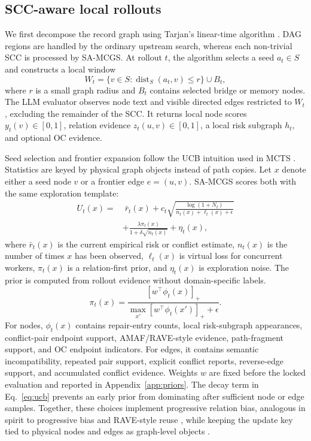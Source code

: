 \documentclass[11pt]{article}
\newcommand{\samcgs}{SA-MCGS}
\newcommand{\scc}{SCC}
\newcommand{\oc}{OC}
\begin{document}
\subsection{SCC-aware local rollouts}

We first decompose the record graph using Tarjan's linear-time algorithm \citep{tarjan1972depth}.  DAG regions are handled by the ordinary upstream search, whereas each non-trivial \scc{} is processed by \samcgs{}.  At rollout $t$, the algorithm selects a seed $a_t\in S$ and constructs a local window
\begin{equation}
    W_t = \{v\in S : \operatorname{dist}_{S}(a_t,v)\leq r\} \cup B_t,
\end{equation}
where $r$ is a small graph radius and $B_t$ contains selected bridge or memory nodes.  The LLM evaluator observes node text and visible directed edges restricted to $W_t$, excluding the remainder of the \scc{}.  It returns local node scores $y_t(v)\in[0,1]$, relation evidence $z_t(u,v)\in[0,1]$, a local risk subgraph $h_t$, and optional \oc{} evidence.

Seed selection and frontier expansion follow the UCB intuition used in MCTS \citep{kocsis2006bandit}. Statistics are keyed by physical graph objects instead of path copies.  Let $x$ denote either a seed node $v$ or a frontier edge $e=(u,v)$.  \samcgs{} scores both with the same exploration template:
\begin{equation}
    \begin{aligned}
    U_t(x)=&\;\bar{r}_t(x)
    + c_t\sqrt{\frac{\log(1+N_t)}
    {n_t(x)+\ell_t(x)+\epsilon}}\\
    &+\frac{\lambda\pi_t(x)}
    {1+\delta\sqrt{n_t(x)}}+\eta_t(x),
    \end{aligned}
    \label{eq:ucb}
\end{equation}
where $\bar{r}_t(x)$ is the current empirical risk or conflict estimate, $n_t(x)$ is the number of times $x$ has been observed, $\ell_t(x)$ is virtual loss for concurrent workers, $\pi_t(x)$ is a relation-first prior, and $\eta_t(x)$ is exploration noise.  The prior is computed from rollout evidence without domain-specific labels.
\begin{equation}
    \pi_t(x)=
    \frac{[w^\top\phi_t(x)]_+}
    {\max_{x'}[w^\top\phi_t(x')]_+ + \epsilon}.
    \label{eq:relation-prior}
\end{equation}
For nodes, $\phi_t(x)$ contains repair-entry counts, local risk-subgraph appearances, conflict-pair endpoint support, AMAF/RAVE-style evidence, path-fragment support, and \oc{} endpoint indicators.  For edges, it contains semantic incompatibility, repeated pair support, explicit conflict reports, reverse-edge support, and accumulated conflict evidence.  Weights $w$ are fixed before the locked evaluation and reported in Appendix~\ref{app:priors}.  The decay term in Eq.~\ref{eq:ucb} prevents an early prior from dominating after sufficient node or edge samples.  Together, these choices implement progressive relation bias, analogous in spirit to progressive bias and RAVE-style reuse \citep{gelly2007combining,chaslot2008progressive,browne2012survey}, while keeping the update key tied to physical nodes and edges as graph-level objects \citep{czech2021monte}.
\end{document}
